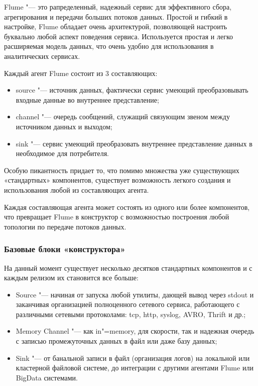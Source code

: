 \documentclass[10pt, a5paper]{article}
\begin{document}
Flume  \cite{Pynkin1} "--- это рапределенный, надежный сервис для эффективного сбора, агрегирования и передачи больших потоков данных. Простой и гибкий в настройке, Flume обладает очень архитектурой, позволяющей настроить буквально любой аспект поведения сервиса. Используется простая и легко расширяемая модель данных, что очень удобно для использования в аналитических сервисах.

Каждый агент Flume состоит из 3 составляющих:

\begin{itemize}
  \item source "--- источник данных, фактически сервис умеющий преобразовывать входные данные во внутреннее представление;
  \item channel "--- очередь сообщений, служащий связующим звеном между источником данных и выходом;
  \item sink "--- сервис умеющий преобразовать внутреннее представление данных в необходимое для потребителя.
\end{itemize}

Особую пикантность придает то, что помимо множества уже существующих «стандартных» компонентов, существует возможность легкого создания и использования любой из составляющих агента.

Каждая составляющая агента может состоять из одного или более компонентов, что превращает Flume в конструктор с возможностью построения любой топологии по передаче потоков данных.

\subsubsection*{Базовые блоки «конструктора»}

На данный момент существует несколько десятков стандартных компонентов и с каждым релизом их становится все больше:

\begin{itemize}
  \item Source "--- начиная от запуска любой утилиты, дающей вывод через stdout и заканчивая организацией полноценного сетевого сервиса, работающего с различными сетевыми протоколами: tcp, http, syslog, AVRO, Thrift и др.;
  \item Memory Channel "--- как in"=memory, для скорости, так и надежная очередь с записью промежуточных данных в файл или даже базу данных;
  \item Sink "--- от банальной записи в файл (организация логов) на локальной или кластерной файловой системе, до интеграции с другими агентами Flume или BigData системами.
\end{itemize}
\end{document}
